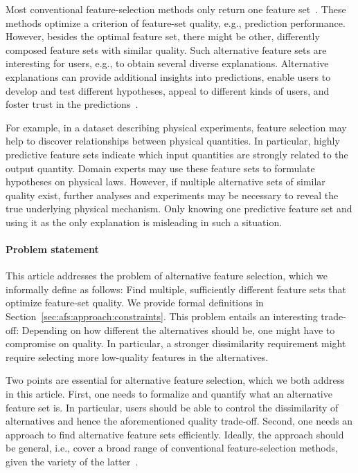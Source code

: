 \documentclass{article}
\theoremstyle{definition}
\begin{document}
Most conventional feature-selection methods only return one feature set~\cite{borboudakis2021extending}.
These methods optimize a criterion of feature-set quality, e.g., prediction performance.
However, besides the optimal feature set, there might be other, differently composed feature sets with similar quality.
Such alternative feature sets are interesting for users, e.g., to obtain several diverse explanations.
Alternative explanations can provide additional insights into predictions, enable users to develop and test different hypotheses, appeal to different kinds of users, and foster trust in the predictions~\cite{kim2021multi, wang2019designing}.

For example, in a dataset describing physical experiments, feature selection may help to discover relationships between physical quantities.
In particular, highly predictive feature sets indicate which input quantities are strongly related to the output quantity.
Domain experts may use these feature sets to formulate hypotheses on physical laws.
However, if multiple alternative sets of similar quality exist, further analyses and experiments may be necessary to reveal the true underlying physical mechanism.
Only knowing one predictive feature set and using it as the only explanation is misleading in such a situation.

\paragraph{Problem statement}

This article addresses the problem of alternative feature selection, which we informally define as follows:
Find multiple, sufficiently different feature sets that optimize feature-set quality.
We provide formal definitions in Section~\ref{sec:afs:approach:constraints}.
This problem entails an interesting trade-off:
Depending on how different the alternatives should be, one might have to compromise on quality.
In particular, a stronger dissimilarity requirement might require selecting more low-quality features in the alternatives.

Two points are essential for alternative feature selection, which we both address in this article.
First, one needs to formalize and quantify what an alternative feature set is.
In particular, users should be able to control the dissimilarity of alternatives and hence the aforementioned quality trade-off.
Second, one needs an approach to find alternative feature sets efficiently.
Ideally, the approach should be general, i.e., cover a broad range of conventional feature-selection methods, given the variety of the latter~\cite{chandrashekar2014survey, li2017feature}.
\end{document}
